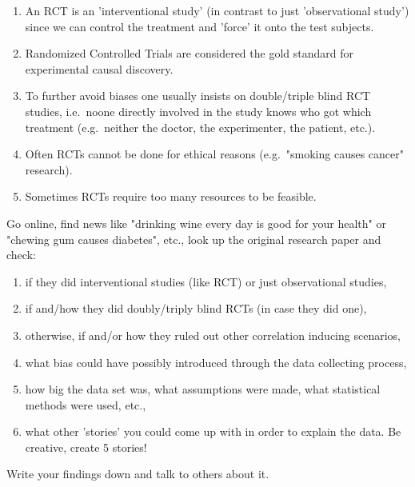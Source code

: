 \begin{Disc}
    \begin{enumerate}
        \item An RCT is an 'interventional study' (in contrast to just 'observational study') since we can control the treatment and 'force' it onto the test subjects.
        \item Randomized Controlled Trials are considered the gold standard for experimental causal discovery.
        \item To further avoid biases one usually insists on double/triple blind RCT studies, 
            i.e.\ noone directly involved in the study knows who got which treatment 
            (e.g.\ neither the doctor, the experimenter, the patient, etc.). 
        \item Often RCTs cannot be done for ethical reasons (e.g.\ "smoking causes cancer" research).
        \item Sometimes RCTs require too many resources to be feasible.
    \end{enumerate}
\end{Disc}


\begin{Exc}
    Go online, find news like "drinking wine every day is good for your health" or "chewing gum causes diabetes", etc., 
    look up the original research paper and check:
    \begin{enumerate}
        \item if they did interventional studies (like RCT) or just observational studies,
        \item if and/how they did doubly/triply blind RCTs (in case they did one),
        \item otherwise, if and/or how they ruled out other correlation inducing scenarios,
        \item what bias could have possibly introduced through the data collecting process,
        \item how big the data set was, what assumptions were made, what statistical methods were used, etc.,
        \item what other 'stories' you could come up with in order to explain the data. Be creative, create 5 stories!
    \end{enumerate}
    Write your findings down and talk to others about it.
\end{Exc}
